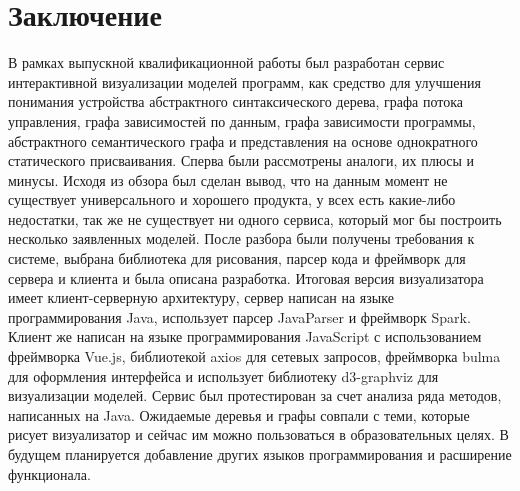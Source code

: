 \chapter*{Заключение} \label{ch-conclusion}
В рамках выпускной квалификационной работы был разработан сервис интерактивной визуализации моделей программ, как средство для улучшения понимания устройства абстрактного синтаксического дерева, графа потока управления, графа зависимостей по данным, графа зависимости программы, абстрактного семантического графа и представления на основе однократного статического присваивания. 
Сперва были рассмотрены аналоги, их плюсы и минусы. Исходя из обзора был сделан вывод, что на данным момент не существует универсального и хорошего продукта, у всех есть какие-либо недостатки, так же не существует ни одного сервиса, который мог бы построить несколько заявленных моделей. После разбора были получены требования к системе, выбрана библиотека для рисования, парсер кода и фреймворк для сервера и клиента и была описана разработка. Итоговая версия визуализатора имеет клиент-серверную архитектуру, сервер написан на языке программирования Java, использует парсер JavaParser и фреймворк Spark. Клиент же написан на языке программирования JavaScript с использованием фреймворка Vue.js, библиотекой axios для сетевых запросов, фреймворка bulma для оформления интерфейса и использует библиотеку d3-graphviz для визуализации моделей.
Сервис был протестирован за счет анализа ряда методов, написанных на Java. Ожидаемые деревья и графы совпали с теми, которые рисует визуализатор и сейчас им можно пользоваться в образовательных целях. В будущем планируется добавление других языков программирования и расширение функционала.
\newpage